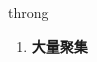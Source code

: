 
\begin{frame}
{\huge throng}
\begin{center}
\begin{enumerate}\Large
  \item \textbf{大量聚集}
\end{enumerate}
\end{center}
\end{frame}
